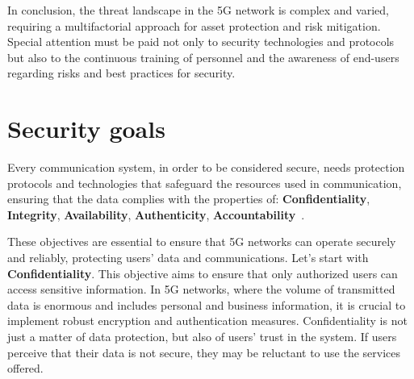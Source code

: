 \documentclass[english]{article}
\begin{document}
In conclusion, the threat landscape in the 5G network is complex and varied,
requiring a multifactorial approach for asset protection and risk mitigation.
Special attention must be paid not only to security technologies and protocols
but also to the continuous training of personnel and the awareness of end-users
regarding risks and best practices for security.

\section{Security goals}\label{sec:SecurityGoal}
Every communication system, in order to be considered secure, needs protection
protocols and technologies that safeguard the resources used in communication,
ensuring that the data complies with the properties of:
\textbf{Confidentiality}, \textbf{Integrity}, \textbf{Availability},
\textbf{Authenticity}, \textbf{Accountability}~\cite{mohan2022cyber}.

These objectives are essential to ensure that 5G networks can operate securely
and reliably, protecting users' data and communications. Let’s start with
\textbf{Confidentiality}. This objective aims to ensure that only authorized users can
access sensitive information. In 5G networks, where the volume of transmitted
data is enormous and includes personal and business information, it is crucial
to implement robust encryption and authentication measures. Confidentiality is
not just a matter of data protection, but also of users' trust in the system.
If users perceive that their data is not secure, they may be reluctant to use
the services offered.
\end{document}
